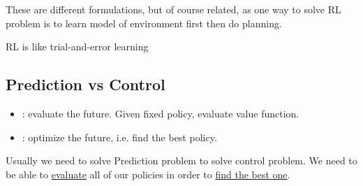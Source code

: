 These are different formulations, but of course related, as one way to solve RL problem is to learn model of environment first then do planning.

RL is like trial-and-error learning 

\subsection{Prediction vs Control}
\begin{itemize}
	\item {}: evaluate the future. Given fixed policy, evaluate value function.
	\item {}: optimize the future, i.e. find the best policy.
\end{itemize}

Usually we need to solve Prediction problem to solve control problem. We need to be able to \underline{evaluate} all of our policies in order to \underline{find the best one}.
